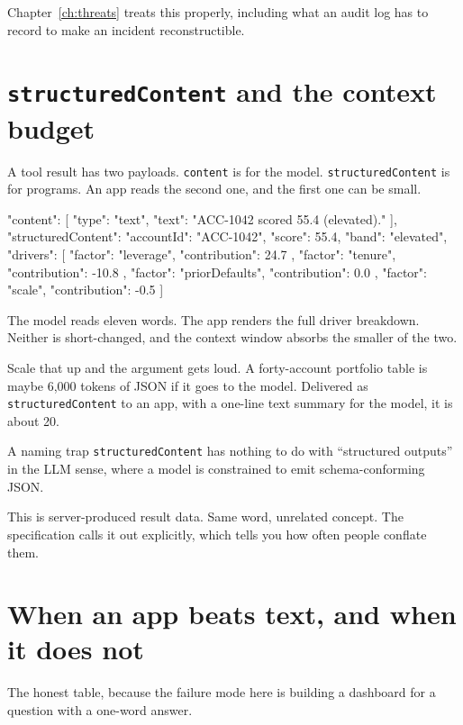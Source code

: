 Chapter~\ref{ch:threats} treats this properly, including what an audit log has
to record to make an incident reconstructible.

\section{\texttt{structuredContent} and the context budget}

A tool result has two payloads. \texttt{content} is for the model.
\texttt{structuredContent} is for programs. An app reads the second one, and the
first one can be small.

\begin{wire}
{
  "content": [
    { "type": "text", "text": "ACC-1042 scored 55.4 (elevated)." }
  ],
  "structuredContent": {
    "accountId": "ACC-1042",
    "score": 55.4,
    "band": "elevated",
    "drivers": [
      { "factor": "leverage", "contribution": 24.7 },
      { "factor": "tenure", "contribution": -10.8 },
      { "factor": "priorDefaults", "contribution": 0.0 },
      { "factor": "scale", "contribution": -0.5 }
    ]
  }
}
\end{wire}

The model reads eleven words. The app renders the full driver breakdown. Neither
is short-changed, and the context window absorbs the smaller of the two.

Scale that up and the argument gets loud. A forty-account portfolio table is
maybe 6,000 tokens of JSON if it goes to the model. Delivered as
\texttt{structuredContent} to an app, with a one-line text summary for the model,
it is about 20.

\begin{notebox}{A naming trap}
\texttt{structuredContent} has nothing to do with ``structured outputs'' in the
LLM sense, where a model is constrained to emit schema-conforming JSON.

This is server-produced result data. Same word, unrelated concept. The
specification calls it out explicitly, which tells you how often people conflate
them.
\end{notebox}

\section{When an app beats text, and when it does not}

The honest table, because the failure mode here is building a dashboard for a
question with a one-word answer.

